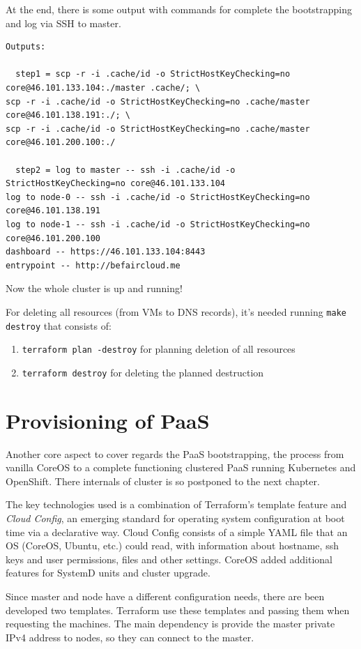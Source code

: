 At the end, there is some output with commands for complete the bootstrapping and log via SSH to master.

\begin{verbatim}
Outputs:

  step1 = scp -r -i .cache/id -o StrictHostKeyChecking=no core@46.101.133.104:./master .cache/; \
scp -r -i .cache/id -o StrictHostKeyChecking=no .cache/master core@46.101.138.191:./; \
scp -r -i .cache/id -o StrictHostKeyChecking=no .cache/master core@46.101.200.100:./

  step2 = log to master -- ssh -i .cache/id -o StrictHostKeyChecking=no core@46.101.133.104
log to node-0 -- ssh -i .cache/id -o StrictHostKeyChecking=no core@46.101.138.191
log to node-1 -- ssh -i .cache/id -o StrictHostKeyChecking=no core@46.101.200.100
dashboard -- https://46.101.133.104:8443
entrypoint -- http://befaircloud.me
\end{verbatim}

Now the whole cluster is up and running!

For deleting all resources (from VMs to DNS records), it's needed running \texttt{make destroy} that consists of:
\begin{enumerate}
\item \texttt{terraform plan -destroy} for planning deletion of all resources
\item \texttt{terraform destroy} for deleting the planned destruction
\end{enumerate}

\section{Provisioning of PaaS}\label{provisioning-of-paas}

Another core aspect to cover regards the PaaS bootstrapping, the process from vanilla CoreOS to a complete functioning clustered PaaS running Kubernetes and OpenShift.  There internals of cluster is so postponed to the next chapter.

The key technologies used is a combination of Terraform's template feature and \textit{Cloud Config}, an emerging standard for operating system configuration at boot time via a declarative way.  Cloud Config consists of a simple YAML file that an OS (CoreOS, Ubuntu, etc.) could read, with information about hostname, ssh keys and user permissions, files and other settings.  CoreOS added additional features for SystemD units and cluster upgrade.

Since master and node have a different configuration needs, there are been developed two templates.  Terraform use these templates and passing them when requesting the machines. The main dependency is provide the master private IPv4 address to nodes, so they can connect to the master.

